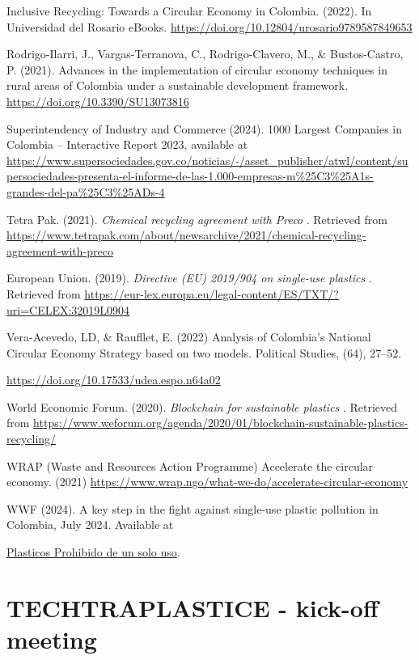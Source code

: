\documentclass[
  12pt,
  oneside]{book}
\begin{document}
Inclusive Recycling: Towards a Circular Economy in Colombia. (2022). In
Universidad del Rosario eBooks.
\url{https://doi.org/10.12804/urosario9789587849653}

Rodrigo-Ilarri, J., Vargas-Terranova, C., Rodrigo-Clavero, M., \&
Bustos-Castro, P. (2021). Advances in the implementation of circular
economy techniques in rural areas of Colombia under a sustainable
development framework. \url{https://doi.org/10.3390/SU13073816}

Superintendency of Industry and Commerce (2024). 1000 Largest Companies
in Colombia -- Interactive Report 2023, available at
\url{https://www.supersociedades.gov.co/noticias/-/asset_publisher/atwl/content/supersociedades-presenta-el-informe-de-las-1.000-empresas-m\%25C3\%25A1s-grandes-del-pa\%25C3\%25ADs-4}

Tetra Pak. (2021). \emph{Chemical recycling agreement with Preco }.
Retrieved from
\url{https://www.tetrapak.com/about/newsarchive/2021/chemical-recycling-agreement-with-preco}

European Union. (2019). \emph{Directive (EU) 2019/904 on single-use
plastics }. Retrieved from
\url{https://eur-lex.europa.eu/legal-content/ES/TXT/?uri=CELEX:32019L0904}

Vera-Acevedo, LD, \& Raufllet, E. (2022) Analysis of Colombia's National
Circular Economy Strategy based on two models. Political Studies, (64),
27--52.

\url{https://doi.org/10.17533/udea.espo.n64a02}

World Economic Forum. (2020). \emph{Blockchain for sustainable plastics
}. Retrieved from
\url{https://www.weforum.org/agenda/2020/01/blockchain-sustainable-plastics-recycling/}

WRAP (Waste and Resources Action Programme) Accelerate the circular
economy. (2021)
\url{https://www.wrap.ngo/what-we-do/accelerate-circular-economy}

WWF (2024). A key step in the fight against single-use plastic pollution
in Colombia, July 2024. Available at

\href{https://www.wwf.org.co/?389650/plasticos-de-un-solo-uso-prohibidos-Colombia\#:~:text=La\%20contaminaci\%C3\%B3n\%20por\%20pl\%C3\%A1sticos\%20es,es\%20reciclado\%20en\%20nuevos\%20empaques}{Plasticos
Prohibido de un solo uso}.

\chapter{TECHTRAPLASTICE - kick-off meeting}\label{sec-kickoff}




\backmatter
\end{document}
